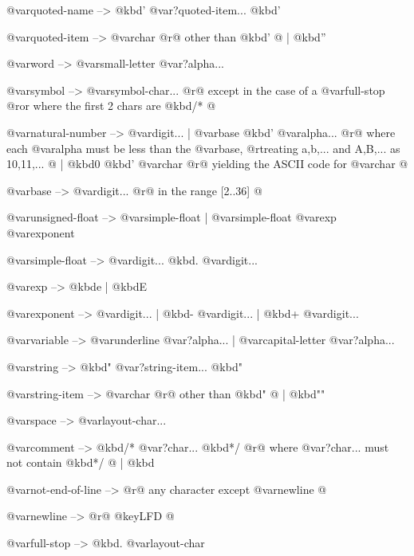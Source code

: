 {{{{@var{quoted-name}       --> @kbd{'} @var{?quoted-item...} @kbd{'}

@var{quoted-item}       --> @var{char}  @r{@{ other than @kbd{'} @}}
                   |  @kbd{''}

@var{word}              --> @var{small-letter} @var{?alpha...}

@var{symbol}            --> @var{symbol-char...}
                         @r{@{ except in the case of a @var{full-stop}}
                           @r{or where the first 2 chars are @kbd{/*} @}}

@var{natural-number}    --> @var{digit...}
                   |  @var{base} @kbd{'} @var{alpha...}
                      @r{@{ where each @var{alpha} must be less than the @var{base},}
                         @r{treating a,b,... and A,B,... as 10,11,... @}}
                   |  @kbd{0} @kbd{'} @var{char}
                      @r{@{ yielding the ASCII code for @var{char} @}}
  
@var{base}              --> @var{digit...}  @r{@{ in the range [2..36] @}}

@var{unsigned-float}    --> @var{simple-float}
                   |  @var{simple-float} @var{exp} @var{exponent}

@var{simple-float}      --> @var{digit...} @kbd{.} @var{digit...}

@var{exp}               --> @kbd{e}  |  @kbd{E}

@var{exponent}          --> @var{digit...} | @kbd{-} @var{digit...} | @kbd{+} @var{digit...}

@var{variable}          --> @var{underline} @var{?alpha...}
                   |  @var{capital-letter} @var{?alpha...}

@var{string}            --> @kbd{"} @var{?string-item...} @kbd{"}

@var{string-item}       --> @var{char}  @r{@{ other than @kbd{"} @}}
                   |  @kbd{""}

@var{space}             --> @var{layout-char...}

@var{comment}           --> @kbd{/*} @var{?char...} @kbd{*/}
                         @r{@{ where @var{?char...} must not contain @kbd{*/} @}}
                   |  @kbd{%

@var{not-end-of-line}   --> @r{@{ any character except @var{newline} @}}

@var{newline}           --> @r{@{ @key{LFD} @}}

@var{full-stop}         --> @kbd{.} @var{layout-char}

}}}}}
